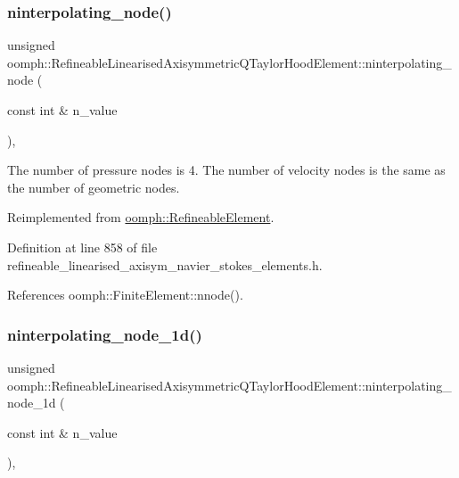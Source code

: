 \subsubsection{\texorpdfstring{ninterpolating\+\_\+node()}{ninterpolating\_node()}}
{\footnotesize\ttfamily unsigned oomph\+::\+Refineable\+Linearised\+Axisymmetric\+Q\+Taylor\+Hood\+Element\+::ninterpolating\+\_\+node (\begin{DoxyParamCaption}\item[{const int \&}]{n\+\_\+value }\end{DoxyParamCaption})\hspace{0.3cm}{\ttfamily [inline]}, {\ttfamily [virtual]}}



The number of pressure nodes is 4. The number of velocity nodes is the same as the number of geometric nodes. 



Reimplemented from \hyperlink{classoomph_1_1RefineableElement_a8b1b5031b55141567ba24913a21534f4}{oomph\+::\+Refineable\+Element}.



Definition at line 858 of file refineable\+\_\+linearised\+\_\+axisym\+\_\+navier\+\_\+stokes\+\_\+elements.\+h.



References oomph\+::\+Finite\+Element\+::nnode().

\mbox{\label{classoomph_1_1RefineableLinearisedAxisymmetricQTaylorHoodElement_ac8a7cc7bd911f1b9bd5ae859f379948a}} 
\subsubsection{\texorpdfstring{ninterpolating\+\_\+node\+\_\+1d()}{ninterpolating\_node\_1d()}}
{\footnotesize\ttfamily unsigned oomph\+::\+Refineable\+Linearised\+Axisymmetric\+Q\+Taylor\+Hood\+Element\+::ninterpolating\+\_\+node\+\_\+1d (\begin{DoxyParamCaption}\item[{const int \&}]{n\+\_\+value }\end{DoxyParamCaption})\hspace{0.3cm}{\ttfamily [inline]}, {\ttfamily [virtual]}}



